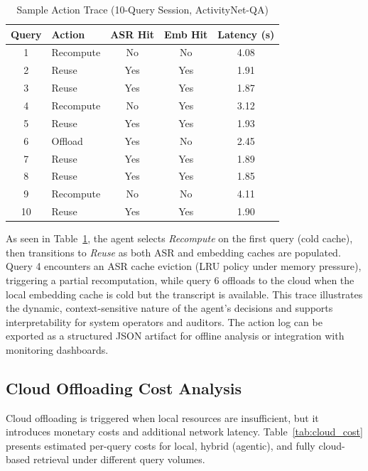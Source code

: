 \documentclass[conference,twocolumn]{IEEEtran}
\begin{document}
\begin{table}[htbp]
\centering
\caption{Sample Action Trace (10-Query Session, ActivityNet-QA)}
\label{tab:action_trace}
\begin{tabular}{clccc}
\toprule
\textbf{Query} & \textbf{Action} & \textbf{ASR Hit} & \textbf{Emb Hit} & \textbf{Latency (s)} \\
\midrule
1  & Recompute & No  & No  & 4.08 \\
2  & Reuse     & Yes & Yes & 1.91 \\
3  & Reuse     & Yes & Yes & 1.87 \\
4  & Recompute & No  & Yes & 3.12 \\
5  & Reuse     & Yes & Yes & 1.93 \\
6  & Offload   & Yes & No  & 2.45 \\
7  & Reuse     & Yes & Yes & 1.89 \\
8  & Reuse     & Yes & Yes & 1.85 \\
9  & Recompute & No  & No  & 4.11 \\
10 & Reuse     & Yes & Yes & 1.90 \\
\bottomrule
\end{tabular}
\end{table}

As seen in Table~\ref{tab:action_trace}, the agent selects \textit{Recompute} on the first query (cold cache), then transitions to \textit{Reuse} as both ASR and embedding caches are populated. Query 4 encounters an ASR cache eviction (LRU policy under memory pressure), triggering a partial recomputation, while query 6 offloads to the cloud when the local embedding cache is cold but the transcript is available. This trace illustrates the dynamic, context-sensitive nature of the agent's decisions and supports interpretability for system operators and auditors. The action log can be exported as a structured JSON artifact for offline analysis or integration with monitoring dashboards.

\subsection{Cloud Offloading Cost Analysis}

Cloud offloading is triggered when local resources are insufficient, but it introduces monetary costs and additional network latency. Table~\ref{tab:cloud_cost} presents estimated per-query costs for local, hybrid (agentic), and fully cloud-based retrieval under different query volumes.
\end{document}
